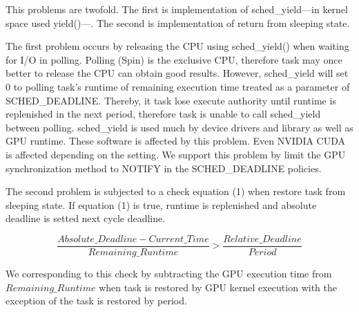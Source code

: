 This problems are twofold.
The first is implementation of sched\_yield---in kernel space used yield()---.
The second is implementation of return from sleeping state.


The first problem occurs by releasing the CPU using sched\_yield() when waiting for I/O in polling.
Polling (Spin) is the exclusive CPU, therefore task may once better to release the CPU can obtain good results.
However, sched\_yield will set 0 to polling task's runtime of remaining execution time treated as a parameter of SCHED\_DEADLINE.
Thereby, it task lose execute authority until runtime is replenished in the next period, therefore task is unable to call sched\_yield between polling.
sched\_yield is used much by device drivers and library as well as GPU runtime.
These software is affected by this problem.
Even NVIDIA CUDA is affected depending on the setting.
We support this problem by limit the GPU synchronization method to NOTIFY  in the SCHED\_DEADLINE policies.

The second problem is subjected to a check equation (1) when restore task from sleeping state.
If equation (1) is true, runtime is replenished and absolute deadline is setted next cycle deadline.

{\scriptsize
\begin{equation}
\frac{Absolute\_Deadline - Current\_Time}{Remaining\_Runtime} > \frac{Relative\_Deadline}{Period}
\end{equation}
}

We corresponding to this check by
subtracting the GPU execution time from $Remaining\_Runtime$
when task is restored by GPU kernel execution with the exception of the task is restored by period.

